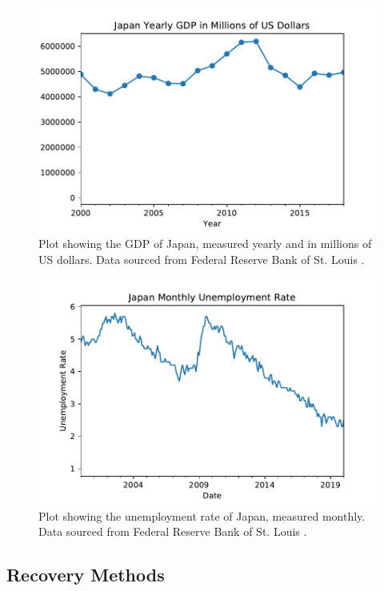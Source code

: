 \documentclass[%
 reprint,
 amsmath,amssymb,
 aps,
]{revtex4-1}
\begin{document}
\begin{figure}
	\includegraphics[scale=0.6]{plot_Japan_GDP.pdf}
	\centering
	\caption{Plot showing the GDP of Japan, measured yearly and in millions of US dollars. Data sourced from Federal Reserve Bank of St. Louis \cite{JPN_GDP_data}.}
	\label{fig:Japan_GDP}
\end{figure}

\begin{figure}
	\includegraphics[scale=0.6]{plot_Japan_unemployment.pdf}
	\centering
	\caption{Plot showing the unemployment rate of Japan, measured monthly. Data sourced from Federal Reserve Bank of St. Louis \cite{JPN_unemployment_data}.}
	\label{fig:Japan_unemployment}
\end{figure}

\subsection{\label{sec:level2} Recovery Methods}
\end{document}

